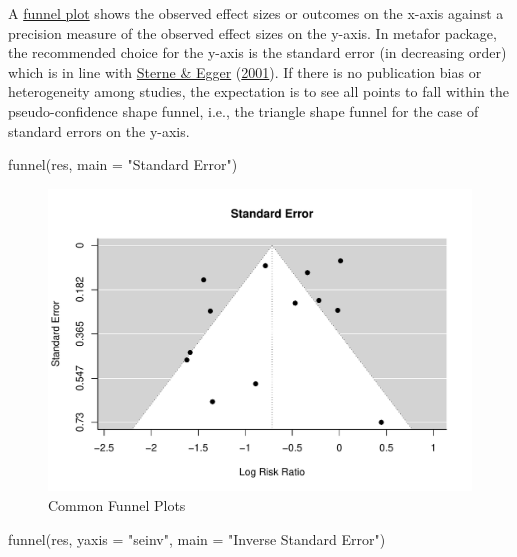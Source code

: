 \documentclass[
  11pt,
]{article}
\newenvironment{Shaded}{\begin{snugshade}}{\end{snugshade}}
\newcommand{\AttributeTok}[1]{\textcolor[rgb]{0.77,0.63,0.00}{#1}}
\newcommand{\FunctionTok}[1]{\textcolor[rgb]{0.00,0.00,0.00}{#1}}
\newcommand{\NormalTok}[1]{#1}
\newcommand{\StringTok}[1]{\textcolor[rgb]{0.31,0.60,0.02}{#1}}
\begin{document}
A \href{https://en.wikipedia.org/wiki/funnel\%20plot}{funnel plot} shows the observed effect sizes or outcomes on the x-axis against a precision measure of the observed effect sizes on the y-axis. In metafor package, the recommended choice for the y-axis is the standard error (in decreasing order) which is in line with \protect\hyperlink{ref-Sterne2001}{Sterne \& Egger} (\protect\hyperlink{ref-Sterne2001}{2001}). If there is no publication bias or heterogeneity among studies, the expectation is to see all points to fall within the pseudo-confidence shape funnel, i.e., the triangle shape funnel for the case of standard errors on the y-axis.

\begin{Shaded}
\begin{Highlighting}[]
\FunctionTok{funnel}\NormalTok{(res, }\AttributeTok{main =} \StringTok{"Standard Error"}\NormalTok{)}
\end{Highlighting}
\end{Shaded}

\begin{figure}

{\centering \includegraphics{IntroToMA_pdf_files/figure-latex/funnel-plot-1} 

}

\caption{Common Funnel Plots}\label{fig:funnel-plot-1}
\end{figure}

\begin{Shaded}
\begin{Highlighting}[]
\FunctionTok{funnel}\NormalTok{(res, }\AttributeTok{yaxis =} \StringTok{"seinv"}\NormalTok{, }\AttributeTok{main =} \StringTok{"Inverse Standard Error"}\NormalTok{)}
\end{Highlighting}
\end{Shaded}
\end{document}
